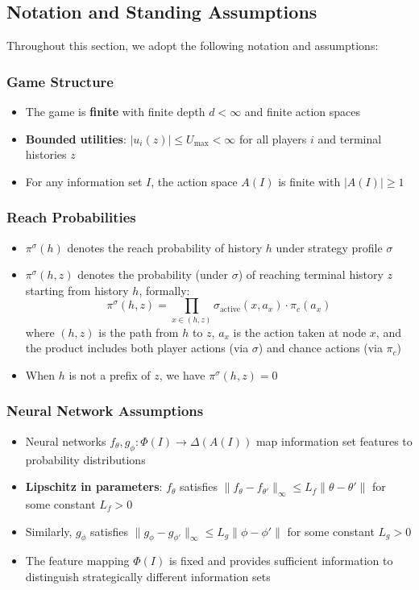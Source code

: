 \documentclass[12pt,a4paper]{article}
\begin{document}
\subsection{Notation and Standing Assumptions}

Throughout this section, we adopt the following notation and assumptions:

\subsubsection{Game Structure}
\begin{itemize}
\item The game is \textbf{finite} with finite depth $d < \infty$ and finite action spaces
\item \textbf{Bounded utilities}: $|u_i(z)| \leq U_{\max} < \infty$ for all players $i$ and terminal histories $z$
\item For any information set $I$, the action space $A(I)$ is finite with $|A(I)| \geq 1$
\end{itemize}

\subsubsection{Reach Probabilities}
\begin{itemize}
\item $\pi^\sigma(h)$ denotes the reach probability of history $h$ under strategy profile $\sigma$
\item $\pi^\sigma(h,z)$ denotes the probability (under $\sigma$) of reaching terminal history $z$ starting from history $h$, formally:
$$\pi^\sigma(h,z) = \prod_{x \in (h,z)} \sigma_{\text{active}}(x, a_x) \cdot \pi_c(a_x)$$
where $(h,z)$ is the path from $h$ to $z$, $a_x$ is the action taken at node $x$, and the product includes both player actions (via $\sigma$) and chance actions (via $\pi_c$)
\item When $h$ is not a prefix of $z$, we have $\pi^\sigma(h,z) = 0$
\end{itemize}

\subsubsection{Neural Network Assumptions}
\begin{itemize}
\item Neural networks $f_\theta, g_\phi: \Phi(I) \rightarrow \Delta(A(I))$ map information set features to probability distributions
\item \textbf{Lipschitz in parameters}: $f_\theta$ satisfies $\|f_\theta - f_{\theta'}\|_\infty \leq L_f \|\theta - \theta'\|$ for some constant $L_f > 0$
\item Similarly, $g_\phi$ satisfies $\|g_\phi - g_{\phi'}\|_\infty \leq L_g \|\phi - \phi'\|$ for some constant $L_g > 0$
\item The feature mapping $\Phi(I)$ is fixed and provides sufficient information to distinguish strategically different information sets
\end{itemize}
\end{document}

